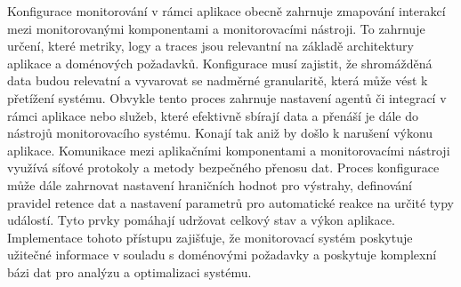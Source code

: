 Konfigurace monitorování v rámci aplikace obecně zahrnuje zmapování interakcí mezi monitorovanými komponentami a monitorovacími nástroji. To zahrnuje určení, které metriky, logy a traces jsou relevantní na základě architektury aplikace a doménových požadavků. Konfigurace musí zajistit, že shromážděná data budou relevatní a vyvarovat se nadměrné granularitě, která může vést k přetížení systému. \cite{Blanco2023} Obvykle tento proces zahrnuje nastavení agentů či integrací v rámci aplikace nebo služeb, které efektivně sbírají data a přenáší je dále do nástrojů monitorovacího systému. Konají tak aniž by došlo k narušení výkonu aplikace. Komunikace mezi aplikačními komponentami a monitorovacími nástroji využívá síťové protokoly a metody bezpečného přenosu dat. Proces konfigurace může dále zahrnovat nastavení hraničních hodnot pro výstrahy, definování pravidel retence dat a nastavení parametrů pro automatické reakce na určité typy událostí. Tyto prvky pomáhají udržovat celkový stav a výkon aplikace. \cite{Blanco2023} Implementace tohoto přístupu zajišťuje, že monitorovací systém poskytuje užitečné informace v souladu s doménovými požadavky a poskytuje komplexní bázi dat pro analýzu a optimalizaci systému.